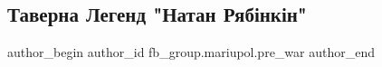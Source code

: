  
 
 
 
 

\subsection{Таверна Легенд "Натан Рябінкін"}
\label{sec:04_02_2023.fb.fb_group.mariupol.pre_war.5.taverna_legend__nata}

\ifcmt
 author_begin
   author_id fb_group.mariupol.pre_war
 author_end
\fi
